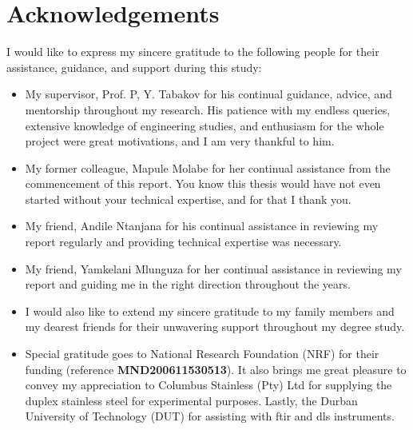 \section*{Acknowledgements}

I would like to express my sincere gratitude to the following people for their assistance, guidance, and support during this study:

\begin{itemize}
    \item My supervisor, Prof. P, Y. Tabakov for his continual guidance, advice, and mentorship throughout my research. His patience with my endless queries, extensive knowledge of engineering studies, and enthusiasm for the whole project were great motivations, and I am very thankful to him.

    \item My former colleague, Mapule Molabe for her continual assistance from the commencement of this report. You know this thesis would have not even started without your technical expertise, and for that I thank you.  

    \item My friend, Andile Ntanjana for his continual assistance in reviewing my report regularly and providing technical expertise was necessary.

    \item My friend, Yamkelani Mlunguza for her continual assistance in reviewing my report and guiding me in the right direction throughout the years. 

    \item I would also like to extend my sincere gratitude to my family members and my dearest friends for their unwavering support throughout my degree study.
    
    \item Special gratitude goes to National Research Foundation (NRF) for their funding (reference \textbf{MND200611530513}). It also brings me great pleasure to convey my appreciation to Columbus Stainless (Pty) Ltd for supplying the duplex stainless steel for experimental purposes. Lastly, the Durban University of Technology (DUT) for assisting with \acrshort{ftir} and \acrshort{dls} instruments.
 \end{itemize}